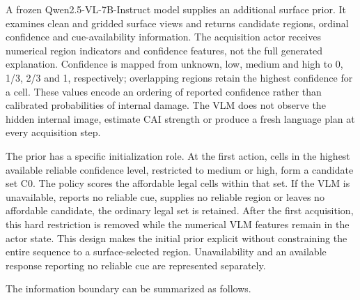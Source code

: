 A frozen Qwen2.5-VL-7B-Instruct model \citep{bai2025} supplies an additional surface prior. It examines clean and gridded surface views and returns candidate regions, ordinal confidence and cue-availability information. The acquisition actor receives numerical region indicators and confidence features, not the full generated explanation. Confidence is mapped from unknown, low, medium and high to 0, 1/3, 2/3 and 1, respectively; overlapping regions retain the highest confidence for a cell. These values encode an ordering of reported confidence rather than calibrated probabilities of internal damage. The VLM does not observe the hidden internal image, estimate CAI strength or produce a fresh language plan at every acquisition step.

The prior has a specific initialization role. At the first action, cells in the highest available reliable confidence level, restricted to medium or high, form a candidate set C0. The policy scores the affordable legal cells within that set. If the VLM is unavailable, reports no reliable cue, supplies no reliable region or leaves no affordable candidate, the ordinary legal set is retained. After the first acquisition, this hard restriction is removed while the numerical VLM features remain in the actor state. This design makes the initial prior explicit without constraining the entire sequence to a surface-selected region. Unavailability and an available response reporting no reliable cue are represented separately.

The information boundary can be summarized as follows.

